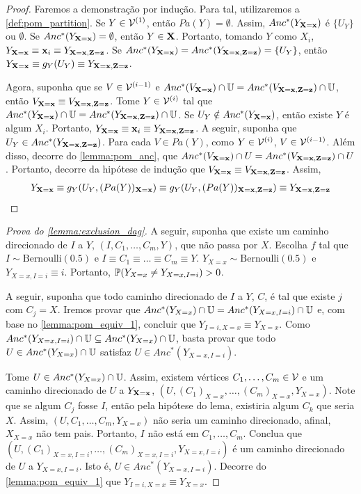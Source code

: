 \begin{proof}
 Faremos a demonstração por indução.
 Para tal, utilizaremos a \cref{def:pom_partition}.
 Se $Y \in \sV^{(1)}$, então $Pa(Y) = \emptyset$.
 Assim, $Anc^*(Y_{\X=\x})$ é $\{U_Y\}$ ou $\emptyset$.
 Se $Anc^*(Y_{\X=\x}) = \emptyset$, 
 então $Y \in \X$. Portanto, tomando $Y$ como $X_i$,
 $Y_{\X=\x} \equiv \x_i \equiv Y_{\X=\x,\Z=\z}$.
 Se $Anc^*(Y_{\X=\x}) = Anc^*(Y_{\X=\x,\Z=\z}) = \{U_Y\}$, então
 $Y_{\X=\x} \equiv g_Y(U_Y) \equiv Y_{\X=\x,\Z=\z}$.
 
 Agora, suponha que se $V \in \sV^{(i-1)}$ e
 $Anc^*(V_{\X=\x}) \cap \U = Anc^*(V_{\X=\x,\Z=\z}) \cap \U$, então
 $V_{\X=\x} \equiv V_{\X=\x,\Z=\z}$. 
 Tome $Y \in \sV^{(i)}$ tal que
 $Anc^*(Y_{\X=\x}) \cap \U = Anc^*(Y_{\X=\x,\Z=\z}) \cap \U$.
 Se $U_Y \notin Anc^*(Y_{\X=\x})$, então
 existe $Y$ é algum $X_i$. Portanto,
 $Y_{\X=\x} \equiv \x_i \equiv Y_{\X=\x,\Z=\z}$.
 A seguir, suponha que $U_Y \in Anc^*(Y_{\X=\x,\Z=\z})$.
 Para cada $V \in Pa(Y)$, como $Y \in \sV^{(i)}$, 
 $V \in \sV^{(i-1)}$.
 Além disso, decorre do \cref{lemma:pom_anc}, que 
 $Anc^*(V_{\X=\x}) \cap U = Anc^*(V_{\X=\x,\Z=\z}) \cap U$.
 Portanto, decorre da hipótese de indução que
 $V_{\X=\x} \equiv V_{\X=\x,\Z=\z}$. Assim,
 \begin{align*}
  Y_{\X=\x} 
  \equiv g_Y(U_Y, (Pa(Y))_{\X=\x})
  \equiv g_Y(U_Y, (Pa(Y))_{\X=\x,\Z=\z})
  \equiv Y_{\X=\x,\Z=\z}
 \end{align*}
\end{proof}

\begin{proof}[Prova do \cref{lemma:exclusion_dag}]
 A seguir, suponha que existe um caminho direcionado de 
 $I$ a $Y$, $(I,C_1,\ldots,C_m,Y)$, que não passa por $X$.
 Escolha $f$ tal que $I \sim \text{Bernoulli}(0.5)$ e
 $I \equiv C_1 \equiv \ldots \equiv C_m \equiv Y$.
 $Y_{X=x} \sim \text{Bernoulli}(0.5)$ e
 $Y_{X=x,I=i} \equiv i$. Portanto,
 $\P(Y_{X=x} \neq Y_{X=x,I=i}) > 0$.

 A seguir, suponha que todo caminho direcionado de 
 $I$ a $Y$, $C$, é tal que existe $j$ com $C_j = X$.
 Iremos provar que 
 $Anc^*(Y_{X=x}) \cap \U = Anc^*(Y_{X=x,I=i}) \cap \U$ e,
 com base no \cref{lemma:pom_equiv_1}, concluir que
 $Y_{I=i,X=x} \equiv Y_{X=x}$.
 Como $Anc^*(Y_{X=x,I=i}) \cap \U 
 \subseteq Anc^*(Y_{X=x}) \cap \U$,
 basta provar que 
 todo $U \in Anc^*(Y_{X=x}) \cap \U$ satisfaz
 $U \in Anc^*(Y_{X=x,I=i})$.
 
 Tome $U \in Anc^*(Y_{X=x}) \cap \U$.
 Assim, existem vértices
 $C_1,\ldots,C_m \in \sV$ e
 um caminho direcionado de
 $U$ a $Y_{\X=\x}$,
 $(U,(C_1)_{X=x},\ldots,(C_m)_{X=x},Y_{X=x})$.
 Note que se algum $C_j$ fosse $I$, então
 pela hipótese do lema, existiria algum $C_k$
 que seria $X$. Assim,
 $(U,C_1,\ldots,C_m,Y_{X=x})$ 
 não seria um caminho direcionado,
 afinal, $X_{X=x}$ não tem pais.
 Portanto, $I$ não está em $C_1,\ldots,C_m$.
 Conclua que 
 $(U,(C_1)_{X=x,I=i},\ldots,(C_m)_{X=x,I=i},Y_{X=x,I=i})$ é
 um caminho direcionado de $U$ a $Y_{X=x,I=i}$.
 Isto é, $U \in Anc^*(Y_{X=x,I=i})$.
 Decorre do \cref{lemma:pom_equiv_1} que
 $Y_{I=i,X=x} \equiv Y_{X=x}$.
\end{proof}

